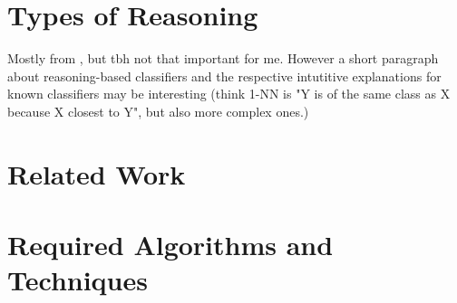 



\section{Types of Reasoning}

Mostly from \cite{Derrac2015}, but tbh not that important for me. However a short paragraph about reasoning-based classifiers and the respective intutitive explanations for known classifiers may be interesting (think 1-NN is "Y is of the same class as X because X closest to Y", but also more complex ones.)


\section{Related Work}


 





\section{Required Algorithms and Techniques}

